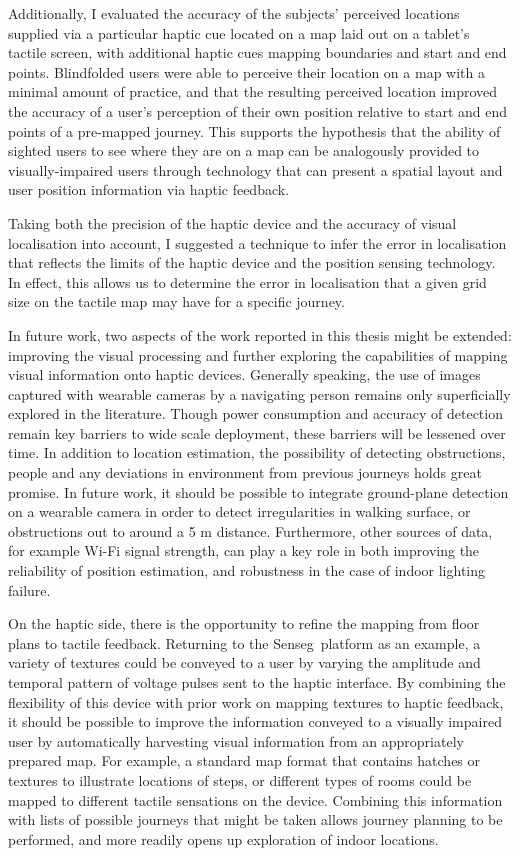 Additionally, I evaluated the accuracy of the subjects' perceived locations supplied via a particular haptic cue located on a map laid out on a tablet's tactile screen, with additional haptic cues mapping boundaries and start and end points. Blindfolded users were able to perceive their location on a map with a minimal amount of practice, and that the resulting perceived location improved the accuracy of a user's perception of their own position relative to start and end points of a pre-mapped journey. This supports the hypothesis that the ability of sighted users to see where they are on a map can be analogously provided to visually-impaired users through technology that can present a spatial layout and user position information via haptic feedback.

Taking both the precision of the haptic device and the accuracy of visual localisation into account, I suggested a technique to infer the error in localisation that reflects the limits of the haptic device and the position sensing technology. In effect, this allows us to determine the error in localisation that a given grid size on the tactile map may have for a specific journey. 

In future work, two aspects of the work reported in this thesis might be extended: improving the visual processing and further exploring the capabilities of mapping visual information onto haptic devices. Generally speaking, the use of images captured with wearable cameras by a navigating person remains only superficially explored in the literature. Though power consumption and accuracy of detection remain key barriers to wide scale deployment, these barriers will be lessened over time. In addition to location estimation, the possibility of detecting obstructions, people and any deviations in environment from previous journeys holds great promise. In future work, it should be possible to integrate ground-plane detection on a wearable camera in order to detect irregularities in walking surface, or obstructions out to around a 5 m distance. Furthermore, other sources of data, for example Wi-Fi signal strength, can play a key role in both improving the reliability of position estimation, and robustness in the case of indoor lighting failure.

On the haptic side, there is the opportunity to refine the mapping from floor plans to tactile feedback. Returning to the Senseg\texttrademark\ platform as an example, a variety of textures could be conveyed to a user by varying the amplitude and temporal pattern of voltage pulses sent to the haptic interface. By combining the flexibility of this device with prior work on mapping textures to haptic feedback, it should be possible to improve the information conveyed to a visually impaired user by automatically harvesting visual information from an appropriately prepared map. For example, a standard map format that contains hatches or textures to illustrate locations of steps, or different types of rooms could be mapped to different tactile sensations on the device. Combining this information with lists of possible journeys that might be taken allows journey planning to be performed, and more readily opens up exploration of indoor locations.


